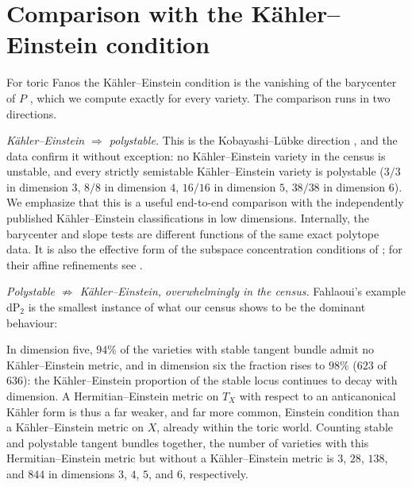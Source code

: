 \documentclass[11pt]{amsart}
\theoremstyle{definition}
\theoremstyle{remark}
\newcommand{\dP}{\mathrm{dP}}
\begin{document}
\section{Comparison with the K\"ahler--Einstein condition}
\label{sec:KE}

For toric Fanos the K\"ahler--Einstein condition is the vanishing of the
barycenter of $P$ \cite{Mabuchi1987,WangZhu2004}, which we compute
exactly for every variety. The comparison runs in two directions.

\emph{K\"ahler--Einstein $\Rightarrow$ polystable.} This is the
Kobayashi--L\"ubke direction \cite{Kobayashi1987,Lubke1983}, and the data
confirm it without exception: no K\"ahler--Einstein variety in the census
is unstable, and every strictly semistable K\"ahler--Einstein variety is
polystable ($3/3$ in dimension $3$, $8/8$ in dimension $4$, $16/16$ in
dimension $5$, $38/38$ in dimension $6$). We emphasize that this is a
useful end-to-end comparison with the independently published
K\"ahler--Einstein classifications in low dimensions. Internally, the
barycenter and slope tests are different functions of the same exact
polytope data. It is also the effective form of the
subspace concentration conditions of \cite{HNS2022,HenkLinke2014}; for
their affine refinements see \cite{Wu2022,FreyerHenkKipp}.

\emph{Polystable $\not\Rightarrow$ K\"ahler--Einstein, overwhelmingly in the
census.}
Fahlaoui's example $\dP_2$ is the smallest instance of what our census
shows to be the dominant behaviour:
\begin{center}
\end{center}
In dimension five, $94\%$ of the varieties with stable tangent bundle
admit no K\"ahler--Einstein metric, and in dimension six the fraction
rises to $98\%$ ($623$ of $636$): the K\"ahler--Einstein proportion of
the stable locus continues to decay with dimension. A Hermitian--Einstein
metric on $T_X$ with respect to an anticanonical K\"ahler form is thus a far
weaker, and
far more common, Einstein condition than a K\"ahler--Einstein metric on
$X$, already within the toric world. Counting stable and polystable tangent
bundles together, the number of varieties with this Hermitian--Einstein
metric but without a K\"ahler--Einstein metric is $3$, $28$, $138$, and
$844$ in dimensions $3$, $4$, $5$, and $6$, respectively.
\end{document}

